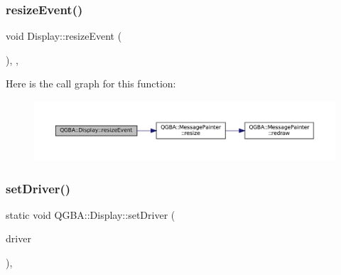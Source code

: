 \subsubsection{\texorpdfstring{resize\+Event()}{resizeEvent()}}
{\footnotesize\ttfamily void Display\+::resize\+Event (\begin{DoxyParamCaption}\item[{Q\+Resize\+Event $\ast$}]{ }\end{DoxyParamCaption})\hspace{0.3cm}{\ttfamily [override]}, {\ttfamily [protected]}, {\ttfamily [virtual]}}

Here is the call graph for this function\+:
\nopagebreak
\begin{figure}[H]
\begin{center}
\leavevmode
\includegraphics[width=350pt]{class_q_g_b_a_1_1_display_a4fef4c98d3800f017b7df2135a6cd9d1_cgraph}
\end{center}
\end{figure}
\mbox{\label{class_q_g_b_a_1_1_display_a4b8340f7f99e587acb59e1cc6a0ef1ca}} 
\subsubsection{\texorpdfstring{set\+Driver()}{setDriver()}}
{\footnotesize\ttfamily static void Q\+G\+B\+A\+::\+Display\+::set\+Driver (\begin{DoxyParamCaption}\item[{\mbox{\hyperlink{class_q_g_b_a_1_1_display_a43f4be6bd7830df1380fcc10165488d0}{Driver}}}]{driver }\end{DoxyParamCaption})\hspace{0.3cm}{\ttfamily [inline]}, {\ttfamily [static]}}

